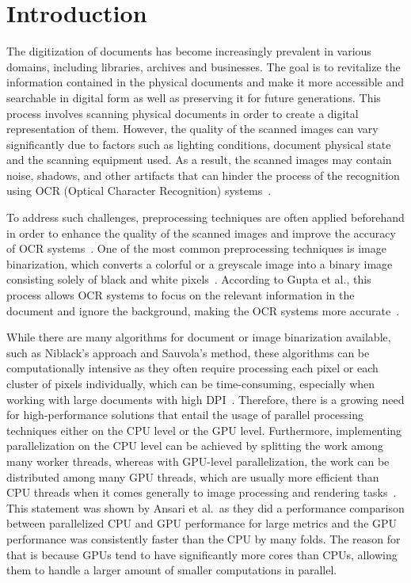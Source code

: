 \section{Introduction}

The digitization of documents has become increasingly prevalent in various domains, including libraries, archives and businesses. The goal is to revitalize the information contained in the physical documents and make it more accessible and searchable in digital form as well as preserving it for future generations. This process involves scanning physical documents in order to create a digital representation of them. However, the quality of the scanned images can vary significantly due to factors such as lighting conditions, document physical state and the scanning equipment used. As a result, the scanned images may contain noise, shadows, and other artifacts that can hinder the process of the recognition using OCR (Optical Character Recognition) systems~\cite{Souibgui_2022}.

To address such challenges, preprocessing techniques are often applied beforehand in order to enhance the quality of the scanned images and improve the accuracy of OCR systems~\cite{GUPTA2007389}. One of the most common preprocessing techniques is image binarization, which converts a colorful or a greyscale image into a binary image consisting solely of black and white pixels~\cite{10.1007/s42979-020-00176-1}. According to Gupta et al., this process allows OCR systems to focus on the relevant information in the document and ignore the background, making the OCR systems more accurate~\cite{GUPTA2007389}.

While there are many algorithms for document or image binarization available, such as Niblack's approach and Sauvola's method, these algorithms can be computationally intensive as they often require processing each pixel or each cluster of pixels individually, which can be time-consuming, especially when working with large documents with high DPI~\cite{10.5120/3877-5418,10.1007/s11042-014-2269-7}. Therefore, there is a growing need for high-performance solutions that entail the usage of parallel processing techniques either on the CPU level or the GPU level. Furthermore, implementing parallelization on the CPU level can be achieved by splitting the work among many worker threads, whereas with GPU-level parallelization, the work can be distributed among many GPU threads, which are usually more efficient than CPU threads when it comes generally to image processing and rendering tasks~\cite{ansari2025acceleratingmatrixmultiplicationperformance}. This statement was shown by Ansari et al.\ as they did a performance comparison between parallelized CPU and GPU performance for large metrics and the GPU performance was consistently faster than the CPU by many folds. The reason for that is because GPUs tend to have significantly more cores than CPUs, allowing them to handle a larger amount of smaller computations in parallel.
